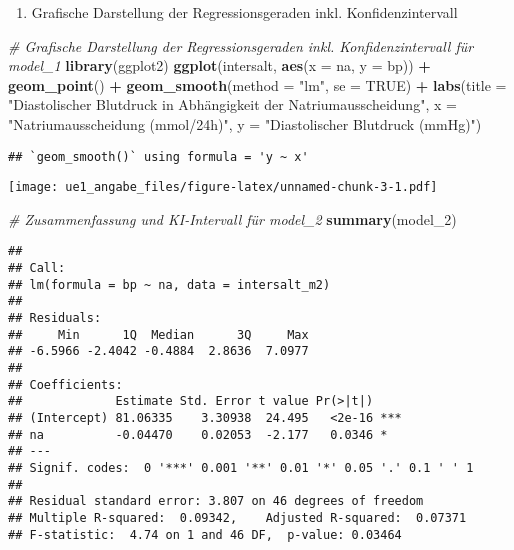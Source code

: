 \documentclass[
]{article}
\newenvironment{Shaded}{\begin{snugshade}}{\end{snugshade}}
\newcommand{\AttributeTok}[1]{\textcolor[rgb]{0.13,0.29,0.53}{#1}}
\newcommand{\CommentTok}[1]{\textcolor[rgb]{0.56,0.35,0.01}{\textit{#1}}}
\newcommand{\ConstantTok}[1]{\textcolor[rgb]{0.56,0.35,0.01}{#1}}
\newcommand{\FunctionTok}[1]{\textcolor[rgb]{0.13,0.29,0.53}{\textbf{#1}}}
\newcommand{\NormalTok}[1]{#1}
\newcommand{\SpecialCharTok}[1]{\textcolor[rgb]{0.81,0.36,0.00}{\textbf{#1}}}
\newcommand{\StringTok}[1]{\textcolor[rgb]{0.31,0.60,0.02}{#1}}
\providecommand{\tightlist}{%
  \setlength{\itemsep}{0pt}\setlength{\parskip}{0pt}}
\begin{document}
\begin{enumerate}
\def\labelenumi{\roman{enumi})}
\tightlist
\item
  Grafische Darstellung der Regressionsgeraden inkl. Konfidenzintervall
\end{enumerate}

\begin{Shaded}
\begin{Highlighting}[]
\CommentTok{\# Grafische Darstellung der Regressionsgeraden inkl. Konfidenzintervall für model\_1}
\FunctionTok{library}\NormalTok{(ggplot2)}
\FunctionTok{ggplot}\NormalTok{(intersalt, }\FunctionTok{aes}\NormalTok{(}\AttributeTok{x =}\NormalTok{ na, }\AttributeTok{y =}\NormalTok{ bp)) }\SpecialCharTok{+}
  \FunctionTok{geom\_point}\NormalTok{() }\SpecialCharTok{+}
  \FunctionTok{geom\_smooth}\NormalTok{(}\AttributeTok{method =} \StringTok{"lm"}\NormalTok{, }\AttributeTok{se =} \ConstantTok{TRUE}\NormalTok{) }\SpecialCharTok{+}
  \FunctionTok{labs}\NormalTok{(}\AttributeTok{title =} \StringTok{"Diastolischer Blutdruck in Abhängigkeit der Natriumausscheidung"}\NormalTok{,}
       \AttributeTok{x =} \StringTok{"Natriumausscheidung (mmol/24h)"}\NormalTok{,}
       \AttributeTok{y =} \StringTok{"Diastolischer Blutdruck (mmHg)"}\NormalTok{)}
\end{Highlighting}
\end{Shaded}

\begin{verbatim}
## `geom_smooth()` using formula = 'y ~ x'
\end{verbatim}

\texttt{[image: ue1\_angabe\_files/figure-latex/unnamed-chunk-3-1.pdf]}

\begin{Shaded}
\begin{Highlighting}[]
\CommentTok{\# Zusammenfassung und KI{-}Intervall für model\_2}
\FunctionTok{summary}\NormalTok{(model\_2)}
\end{Highlighting}
\end{Shaded}

\begin{verbatim}
## 
## Call:
## lm(formula = bp ~ na, data = intersalt_m2)
## 
## Residuals:
##     Min      1Q  Median      3Q     Max 
## -6.5966 -2.4042 -0.4884  2.8636  7.0977 
## 
## Coefficients:
##             Estimate Std. Error t value Pr(>|t|)    
## (Intercept) 81.06335    3.30938  24.495   <2e-16 ***
## na          -0.04470    0.02053  -2.177   0.0346 *  
## ---
## Signif. codes:  0 '***' 0.001 '**' 0.01 '*' 0.05 '.' 0.1 ' ' 1
## 
## Residual standard error: 3.807 on 46 degrees of freedom
## Multiple R-squared:  0.09342,    Adjusted R-squared:  0.07371 
## F-statistic:  4.74 on 1 and 46 DF,  p-value: 0.03464
\end{verbatim}
\end{document}
